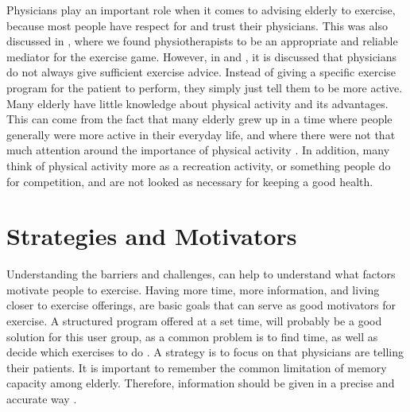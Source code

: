 Physicians play an important role when it comes to advising elderly to exercise, because most people have respect for and trust their physicians. This was also discussed in \cite{project}, where we found physiotherapists to be an appropriate and reliable mediator for the exercise game. However, in \cite{schutzer} and \cite{chao}, it is discussed that physicians do not always give sufficient exercise advice. Instead of giving a specific exercise program for the patient to perform, they simply just tell them to be more active. Many elderly have little knowledge about physical activity and its advantages. This can come from the fact that many elderly grew up in a time where people generally were more active in their everyday life, and where there were not that much attention around the importance of physical activity \cite{schutzer}. In addition, many think of physical activity more as a recreation activity, or something people do for competition, and are not looked as necessary for keeping a good health.  

\section{Strategies and Motivators}
\label{sec:motivators}
Understanding the barriers and challenges, can help to understand what factors motivate people to exercise. Having more time, more information, and living closer to exercise offerings, are basic goals that can serve as good motivators for exercise. A structured program offered at a set time, will probably be a good solution for this user group, as a common problem is to find time, as well as decide which exercises to do \cite{chao}. A strategy is to focus on that physicians are telling their patients. It is important to remember the common limitation of memory capacity among elderly. Therefore, information should be given in a precise and accurate way \cite{chao}.  

